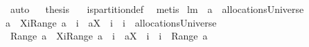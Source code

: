 \begin{isabellebody}
\ auto\isanewline
\isacommand{{\isacharbraceright}}\isamarkupfalse%
\isanewline
{}\isamarkupfalse%
\ \isamarkupfalse%
\ {\isacharquery}thesis\ \isamarkupfalse%
\ {}\ is{\isacharunderscore}partition{\isacharunderscore}def\ \isamarkupfalse%
\ metis\isanewline
{}\isamarkupfalse%
%
\endisatagproof
{\isafoldproof}%
%
\isadelimproof
\isanewline
%
\endisadelimproof
\isanewline
{}\isamarkupfalse%
\ lm{}{}{\isacharcolon}\ \ {\isachardoublequoteopen}a\ {\isasymin}\ allocationsUniverse{\isachardoublequoteclose}\ \ \isanewline
{\isachardoublequoteopen}{\isacharparenleft}a\ {\isacharminus}\ {\isacharparenleft}{\isacharparenleft}X{\isasymunion}{\isacharbraceleft}i{\isacharbraceright}{\isacharparenright}{\isasymtimes}{\isacharparenleft}Range\ a{\isacharparenright}{\isacharparenright}{\isacharparenright}\ {\isasymunion}\ {\isacharparenleft}{\isacharbraceleft}{\isacharparenleft}i{\isacharcomma}\ {\isasymUnion}\ {\isacharparenleft}a{\isacharbackquote}{\isacharbackquote}{\isacharparenleft}X\ {\isasymunion}\ {\isacharbraceleft}i{\isacharbraceright}{\isacharparenright}{\isacharparenright}{\isacharparenright}{\isacharbraceright}\ {\isacharminus}\ {\isacharbraceleft}{\isacharparenleft}i{\isacharcomma}{\isacharbraceleft}{\isacharbraceright}{\isacharparenright}{\isacharbraceright}{\isacharparenright}\ {\isasymin}\ allocationsUniverse\ {\isacharampersand}\ \isanewline
{\isasymUnion}\ {\isacharparenleft}Range\ {\isacharparenleft}{\isacharparenleft}a\ {\isacharminus}\ {\isacharparenleft}{\isacharparenleft}X{\isasymunion}{\isacharbraceleft}i{\isacharbraceright}{\isacharparenright}{\isasymtimes}{\isacharparenleft}Range\ a{\isacharparenright}{\isacharparenright}{\isacharparenright}\ {\isasymunion}\ {\isacharparenleft}{\isacharbraceleft}{\isacharparenleft}i{\isacharcomma}\ {\isasymUnion}\ {\isacharparenleft}a{\isacharbackquote}{\isacharbackquote}{\isacharparenleft}X\ {\isasymunion}\ {\isacharbraceleft}i{\isacharbraceright}{\isacharparenright}{\isacharparenright}{\isacharparenright}{\isacharbraceright}\ {\isacharminus}\ {\isacharbraceleft}{\isacharparenleft}i{\isacharcomma}{\isacharbraceleft}{\isacharbraceright}{\isacharparenright}{\isacharbraceright}{\isacharparenright}{\isacharparenright}{\isacharparenright}\ {\isacharequal}\ {\isasymUnion}{\isacharparenleft}Range\ a{\isacharparenright}{\isachardoublequoteclose}\isanewline
%
\isadelimproof
%
\endisadelimproof
%
\isatagproof
{}\isamarkupfalse%
\ {\isacharminus}\isanewline

\end{isabellebody}

